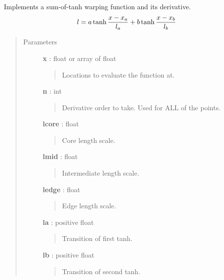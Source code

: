 \documentclass[letterpaper,10pt,english]{sphinxmanual}
\begin{document}

\begin{fulllineitems}
\label{gptools.kernel:gptools.kernel.gibbs.double_tanh_warp}
Implements a sum-of-tanh warping function and its derivative.
\begin{gather}
\begin{split}l = a\tanh\frac{x-x_a}{l_a} + b\tanh\frac{x-x_b}{l_b}\end{split}\notag
\end{gather}\begin{quote}\begin{description}
\item[{Parameters}] \leavevmode
\textbf{x} : float or array of float
\begin{quote}

Locations to evaluate the function at.
\end{quote}

\textbf{n} : int
\begin{quote}

Derivative order to take. Used for ALL of the points.
\end{quote}

\textbf{lcore} : float
\begin{quote}

Core length scale.
\end{quote}

\textbf{lmid} : float
\begin{quote}

Intermediate length scale.
\end{quote}

\textbf{ledge} : float
\begin{quote}

Edge length scale.
\end{quote}

\textbf{la} : positive float
\begin{quote}

Transition of first tanh.
\end{quote}

\textbf{lb} : positive float
\begin{quote}

Transition of second tanh.
\end{quote}


\end{description}
\end{quote}
\end{fulllineitems}
\end{document}
